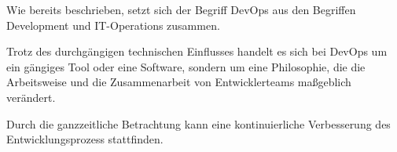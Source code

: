 Wie bereits beschrieben, setzt sich der Begriff DevOps aus den Begriffen Development und IT-Operations zusammen. 

Trotz des durchgängigen technischen Einflusses handelt es sich bei DevOps um ein gängiges Tool oder eine Software, sondern um eine Philosophie, die die Arbeitsweise und die Zusammenarbeit von Entwicklerteams maßgeblich verändert. 

Durch die ganzzeitliche Betrachtung kann eine kontinuierliche Verbesserung des Entwicklungsprozess stattfinden.